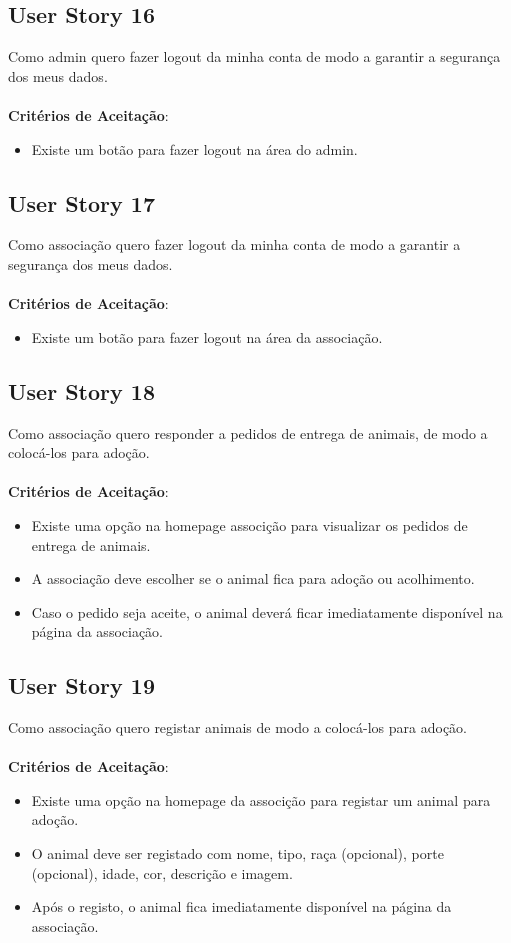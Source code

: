 \documentclass[a4paper,11pt]{article}
\begin{document}
\subsection{User Story 16}
Como admin quero fazer logout da minha conta de modo a garantir a segurança dos meus dados.\\\\
\textbf{Critérios de Aceitação}:
\begin{itemize}
  \item Existe um botão para fazer logout na área do admin.
\end{itemize}

\subsection{User Story 17}
Como associação quero fazer logout da minha conta de modo a garantir a segurança dos meus dados.\\\\
\textbf{Critérios de Aceitação}:
\begin{itemize}
  \item Existe um botão para fazer logout na área da associação.
\end{itemize}

\subsection{User Story 18}
Como associação quero responder a pedidos de entrega de animais, de modo a colocá-los para adoção.\\\\
\textbf{Critérios de Aceitação}:
\begin{itemize}
  \item Existe uma opção na homepage associção para visualizar os pedidos de entrega de animais.
  \item A associação deve escolher se o animal fica para adoção ou acolhimento.
  \item Caso o pedido seja aceite, o animal deverá ficar imediatamente disponível na página da associação.
\end{itemize}

\subsection{User Story 19}
Como associação quero registar animais de modo a colocá-los para adoção.\\\\
\textbf{Critérios de Aceitação}:
\begin{itemize}
  \item Existe uma opção na homepage da associção para registar um animal para adoção.
  \item O animal deve ser registado com nome, tipo, raça (opcional), porte (opcional), idade, cor, descrição e imagem.
  \item Após o registo, o animal fica imediatamente disponível na página da associação.
\end{itemize}
\end{document}
